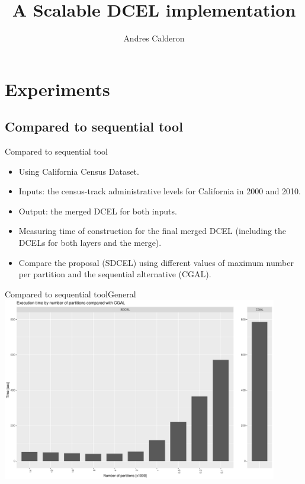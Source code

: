 \documentclass{beamer}
\makeatletter
\newcommand\makebeamertitle{\frame{\maketitle}}%
\let\origtableofcontents=\tableofcontents
\def\tableofcontents{\@ifnextchar[{\origtableofcontents}{\gobbletableofcontents}}
\def\gobbletableofcontents#1{\origtableofcontents}
\makeatother
\begin{document}
\title[DDCEL report]{A Scalable DCEL implementation}
\author[AC]{Andres Calderon}
\makebeamertitle
\newif\iflattersubsect


\AtBeginSubsection[] {
  \begin{frame}<beamer>
    \frametitle{Outline} 
    \tableofcontents[currentsubsection]  
  \end{frame}
}

\section*{Experiments}

\subsection{Compared to sequential tool}

\begin{frame}{Compared to sequential tool}
    \begin{itemize}
        \item Using California Census Dataset.
        \item Inputs: the census-track administrative levels for California in 2000 and 2010.
        \item Output: the merged DCEL for both inputs.
        \item Measuring time of construction for the final merged DCEL (including the DCELs for both layers and the merge).
        \item Compare the proposal (SDCEL) using different values of maximum number per partition and the sequential alternative (CGAL).
    \end{itemize}
\end{frame}

\begin{frame}{Compared to sequential tool}{General}
    \centering 
    \includegraphics[width=0.9\textwidth]{figures/ca.pdf}
\end{frame}
\end{document}
